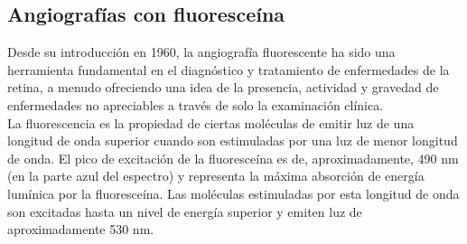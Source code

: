	\subsection{Angiograf\'ias con fluoresce\'ina}

	
Desde su introducción en 1960, la angiografía fluorescente ha sido una herramienta fundamental en el diagnóstico y tratamiento de enfermedades de la retina, a menudo ofreciendo una idea de la presencia, actividad y gravedad de enfermedades no apreciables a través de solo la examinación clínica.\cite{patel2014ultra}
\\

La fluorescencia es la propiedad de ciertas mol\'eculas de emitir luz de una longitud de onda superior cuando son
estimuladas por una luz de menor longitud de onda. El pico de excitaci\'on de la fluoresce\'ina es de, aproximadamente, 490 nm (en la parte azul del espectro) y representa la m\'axima absorci\'on de energ\'ia lum\'inica por la fluoresce\'ina. Las mol\'eculas estimuladas por esta longitud de onda son excitadas hasta un nivel de energ\'ia superior y emiten luz de aproximadamente 530 nm.


